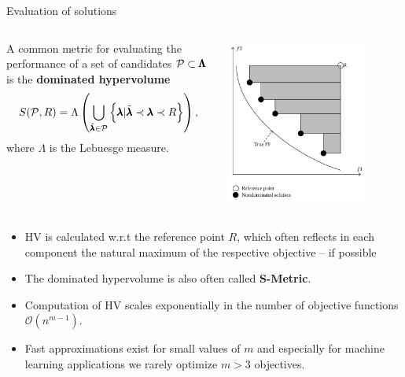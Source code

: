 \begin{frame}[allowframebreaks]{Evaluation of solutions}


\begin{columns}
\begin{column}{0.5\textwidth}

A common metric for evaluating the performance of a set of candidates $\mathcal{P} \subset \pmb{\Lambda}$ is the \textbf{dominated hypervolume}
$$
    S(\mathcal{P}, R) = \Lambda\left(\bigcup_{\tilde{\pmb{\lambda}} \in \mathcal{P}}\left\{\pmb{\lambda} | \tilde{\pmb{\lambda}} \prec \pmb{\lambda} \prec R\right\}\right),
$$
where $\Lambda$ is the Lebuesge measure.
\end{column}
\begin{column}{0.5\textwidth}
\begin{center}
\includegraphics[width=0.8\textwidth]{images/dominated_hypervolume.png}
\end{center}
\end{column}
\end{columns}
    

\framebreak

\begin{itemize}
            \item HV is calculated w.r.t the reference point $R$, which often reflects in each component the natural maximum of the respective objective -- if possible
            \item The dominated hypervolume is also often called \textbf{S-Metric}.
            \item Computation of HV scales exponentially in the number of objective functions $\mathcal{O}(n^{m-1})$.
            \item Fast approximations exist for small values of $m$ and especially for machine learning applications we rarely optimize $m > 3$ objectives.
    \end{itemize}

\end{frame}


